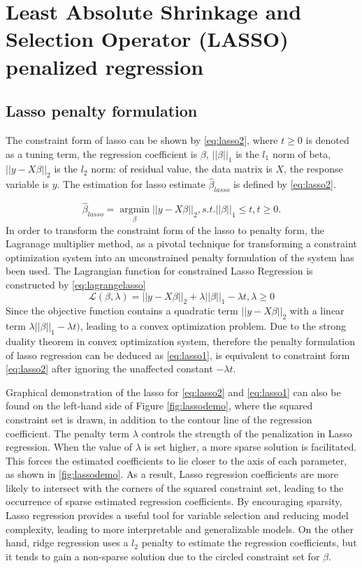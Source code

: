 \section{Least Absolute Shrinkage and Selection Operator (LASSO) penalized regression}
\subsection{Lasso penalty formulation}
The constraint form of lasso can be shown by \autoref{eq:lasso2}, where $t \geq 0$ is denoted as a tuning term, the regression coefficient is $\beta$, $||\beta||_1$ is the $l_1$ norm of beta, $||y-X\beta||_2$ is the $l_2$ norm: of residual value, the data matrix is $X$, the response variable is $y$. The estimation for lasso estimate $\hat{\beta}_{lasso}$ is defined by \autoref{eq:lasso2}. 

\begin{equation}
	\label{eq:lasso2}
	\hat{\beta}_{lasso} = \underset{\beta}{\operatorname{argmin}} ||y-X\beta||_2, s.t. ||\beta||_1 \leq t, t \geq 0.
\end{equation}
In order to transform the constraint form of the lasso to penalty form, the Lagranage multiplier method, as a pivotal technique for transforming a constraint optimization system into an unconstrained penalty formulation of the system has been used. The Lagrangian function for constrained Lasso Regression is constructed by \autoref{eq:lagrangelasso}
\begin{equation}
	\label{eq:lagrangelasso}
	\mathcal{L}(\beta,\lambda) =  ||y-X\beta||_2 + \lambda||\beta||_1 - \lambda t, \lambda \geq 0
\end{equation}
Since the objective function contains a quadratic term $||y-X\beta||_2$ with a linear term $\lambda||\beta||_1 - \lambda t)$, leading to a convex optimization problem. Due to the strong duality theorem in convex optimization system, therefore the penalty formulation of lasso regression can be deduced as \autoref{eq:lasso1}, is equivalent to constraint form \autoref{eq:lasso2} after ignoring the unaffected constant $-\lambda t$.


Graphical demonstration of the lasso for \autoref{eq:lasso2} and \autoref{eq:lasso1} can also be found on the left-hand side of Figure \ref{fig:lassodemo}, where the squared constraint set is drawn, in addition to the contour line of the regression coefficient. The penalty term $\lambda$ controls the strength of the penalization in Lasso regression. When the value of $\lambda$ is set higher, a more sparse solution is facilitated. This forces the estimated coefficients to lie closer to the axis of each parameter, as shown in \ref{fig:lassodemo}. As a result, Lasso regression coefficients are more likely to intersect with the corners of the squared constraint set, leading to the occurrence of sparse estimated regression coefficients. By encouraging sparsity, Lasso regression provides a useful tool for variable selection and reducing model complexity, leading to more interpretable and generalizable models. On the other hand, ridge regression uses a $l_2$ penalty to estimate the regression coefficients, but it tends to gain a non-sparse solution due to the circled constraint set for $\beta$.

